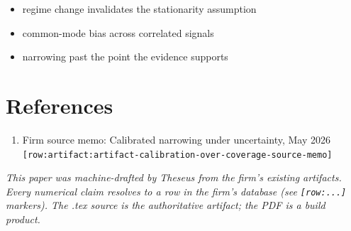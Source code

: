 \documentclass[11pt,letterpaper]{article}
\newcommand{\rowref}[1]{\texttt{\small[row:#1]}}
\begin{document}
\begin{itemize}[leftmargin=1.5em]
  \item regime change invalidates the stationarity assumption
  \item common-mode bias across correlated signals
  \item narrowing past the point the evidence supports
\end{itemize}
\section{References}
\begin{enumerate}[leftmargin=2em]
  \item Firm source memo: Calibrated narrowing under uncertainty, May 2026 \rowref{artifact:artifact-calibration-over-coverage-source-memo}
\end{enumerate}

\vfill
\begin{center}\small
\textit{This paper was machine-drafted by Theseus from the firm's existing
artifacts. Every numerical claim resolves to a row in the firm's
database (see \rowref{...} markers). The .tex source is the authoritative
artifact; the PDF is a build product.}
\end{center}
\end{document}
